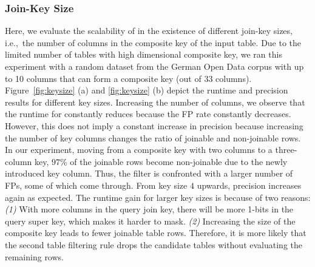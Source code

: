 \subsubsection{Join-Key Size}

Here, we evaluate the scalability of \system in the existence of different join-key sizes, i.e.,~the number of columns in the composite key of the input table. 
Due to the limited number of tables with high dimensional composite key, we ran this experiment with a random dataset from the German Open Data corpus with up to 10 columns that can form a composite key (out of 33 columns).
Figure~\ref{fig:keysize} (a) and \ref{fig:keysize} (b) depict the runtime and precision results for different key sizes.
Increasing the number of columns, we observe that the runtime for \system constantly reduces because the FP rate constantly decreases. However, this does not imply a constant increase in precision because increasing the number of key columns changes the ratio of joinable and non-joinable rows. In our experiment, moving from a composite key with two columns to a three-column key, $97\%$ of the joinable rows become non-joinable due to the newly introduced key column. Thus, the filter is confronted with a larger number of FPs, some of which come through.
From key size $4$ upwards, precision increases again as expected.
The runtime gain for larger key sizes is because of two reasons:
\textit{(1)}  With more columns in the query join key, there will be more 1-bits in the query super key, which makes it harder to mask. 
\textit{(2)} Increasing the size of the composite key leads to fewer joinable table rows. Therefore, it is more likely that the second table filtering rule drops the candidate tables without evaluating the remaining rows.

